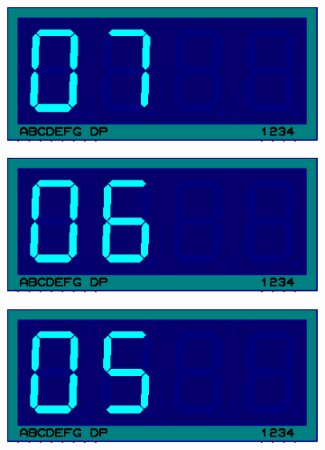 \documentclass{lab_sheet}
\begin{document}
    \begin{figure}[H]\ContinuedFloat
        \begin{subfigure}{.33\textwidth}
            \centering
            \includegraphics[frame,width=.9\linewidth]{../Figures/d7}   
            \caption{}
            \label{fig:prob2-a8}
          \end{subfigure}
          \begin{subfigure}{.33\textwidth}
            \centering
            \includegraphics[frame,width=.9\linewidth]{../Figures/d6}   
            \caption{}
            \label{fig:prob2-a9}
          \end{subfigure}
          \begin{subfigure}{.33\textwidth}
            \centering
            \includegraphics[frame,width=.9\linewidth]{../Figures/d5}   
            \caption{}
            \label{fig:prob2-a10}
          \end{subfigure}
          \newline

\end{figure}
\end{document}
